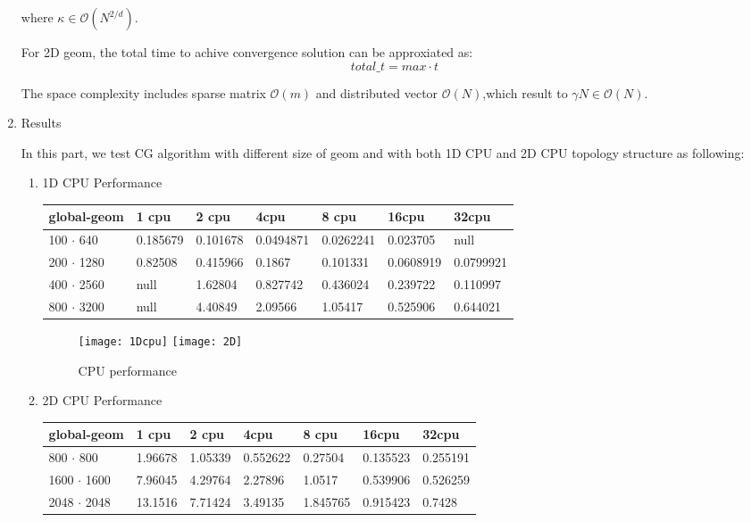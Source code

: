 \documentclass[11pt]{article}
\begin{document}
\begin{enumerate}
	where $\kappa \in \mathcal{O}(N^{2/d})$.

	For 2D geom, the total time to achive convergence solution can be approxiated as:
	\begin{equation}
	total\_t = max \cdot t
	\end{equation}

	The space complexity includes sparse matrix $\mathcal{O}(m)$ and distributed vector $\mathcal{O}(N)$,which result to $ \gamma  N \in \mathcal{O}(N)$.

	\item{Results}
	
	In this part, we test CG algorithm with different size of geom and with both 1D CPU and 2D CPU topology structure as following:

	\begin{enumerate}
	\item{1D CPU Performance}
\begin{center}
	\begin{tabular}{|l |l |l | l|l|l|l|}
	\hline
	global-geom  & 1 cpu & 2 cpu & 4cpu & 8 cpu & 16cpu  & 32cpu \\ \hline
	100 $\cdot$ 640 &  0.185679 & 0.101678 & 0.0494871 & 0.0262241 & 0.023705 & null \\	\hline
	200 $\cdot$ 1280 & 0.82508 & 0.415966 & 0.1867 & 0.101331 & 0.0608919 & 0.0799921 \\ \hline
	400 $\cdot$ 2560 & null & 1.62804 & 0.827742 & 0.436024 & 0.239722 & 0.110997 \\ \hline
	800 $\cdot$ 3200  & null & 4.40849 & 2.09566 & 1.05417 & 0.525906 & 0.644021\\ 
	\hline 	
	\end{tabular}
\end{center}
 
\begin{figure}[h!]
\centerline
{
	\texttt{[image: 1Dcpu]}
	\texttt{[image: 2D]}
}
\caption{CPU performance}
\end{figure}

	\item{2D CPU Performance}

\begin{center}
	\begin{tabular}{|l |l |l | l|l|l|l|}
	\hline
	global-geom  & 1 cpu & 2 cpu & 4cpu & 8 cpu & 16cpu  & 32cpu \\ \hline
	800 $\cdot$ 800 &  1.96678 & 1.05339 & 0.552622 & 0.27504 & 0.135523 & 0.255191\\	\hline
	1600 $\cdot$ 1600 &  7.96045 & 4.29764 & 2.27896 & 1.0517 & 0.539906 & 0.526259 \\ \hline
	2048 $\cdot$ 2048  & 13.1516 & 7.71424 & 3.49135 & 1.845765 & 0.915423 & 0.7428\\ 
	\hline 	
	\end{tabular}
\end{center}

	\end{enumerate}


	\end{enumerate}
\end{document}
